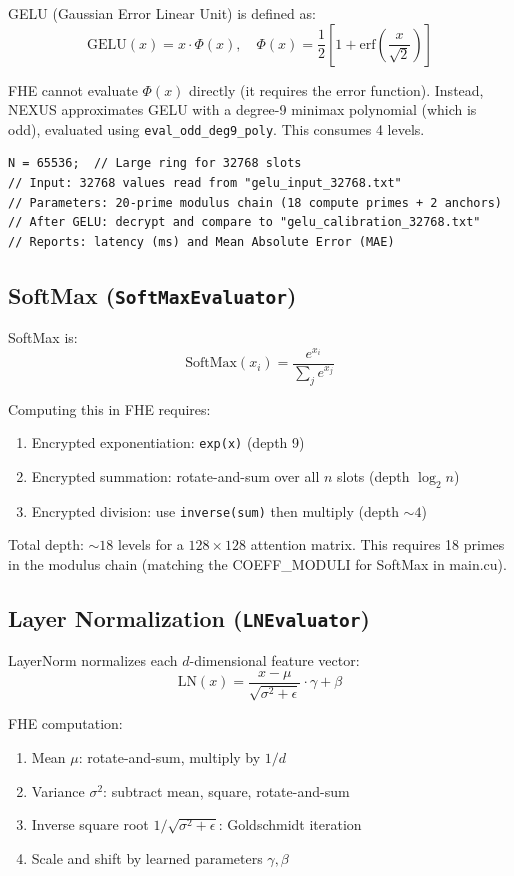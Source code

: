 \documentclass[11pt,letterpaper]{article}
\begin{document}
GELU (Gaussian Error Linear Unit) is defined as:
\[
\text{GELU}(x) = x \cdot \Phi(x), \quad \Phi(x) = \frac{1}{2}\left[1 + \text{erf}\left(\frac{x}{\sqrt{2}}\right)\right]
\]

FHE cannot evaluate $\Phi(x)$ directly (it requires the error function). Instead, NEXUS
approximates GELU with a degree-9 minimax polynomial (which is odd), evaluated using
\texttt{eval\_odd\_deg9\_poly}. This consumes 4 levels.

\begin{lstlisting}[style=cpp, caption=GELU benchmark setup (main.cu)]
N = 65536;  // Large ring for 32768 slots
// Input: 32768 values read from "gelu_input_32768.txt"
// Parameters: 20-prime modulus chain (18 compute primes + 2 anchors)
// After GELU: decrypt and compare to "gelu_calibration_32768.txt"
// Reports: latency (ms) and Mean Absolute Error (MAE)
\end{lstlisting}

\subsection{SoftMax (\texttt{SoftMaxEvaluator})}

SoftMax is:
\[
\text{SoftMax}(x_i) = \frac{e^{x_i}}{\sum_j e^{x_j}}
\]

Computing this in FHE requires:
\begin{enumerate}
  \item Encrypted exponentiation: \texttt{exp(x)} (depth 9)
  \item Encrypted summation: rotate-and-sum over all $n$ slots (depth $\log_2 n$)
  \item Encrypted division: use \texttt{inverse(sum)} then multiply (depth $\sim 4$)
\end{enumerate}

Total depth: $\sim 18$ levels for a $128 \times 128$ attention matrix. This requires 18
primes in the modulus chain (matching the COEFF\_MODULI for SoftMax in main.cu).

\subsection{Layer Normalization (\texttt{LNEvaluator})}

LayerNorm normalizes each $d$-dimensional feature vector:
\[
\text{LN}(x) = \frac{x - \mu}{\sqrt{\sigma^2 + \epsilon}} \cdot \gamma + \beta
\]

FHE computation:
\begin{enumerate}
  \item Mean $\mu$: rotate-and-sum, multiply by $1/d$
  \item Variance $\sigma^2$: subtract mean, square, rotate-and-sum
  \item Inverse square root $1/\sqrt{\sigma^2 + \epsilon}$: Goldschmidt iteration
  \item Scale and shift by learned parameters $\gamma, \beta$
\end{enumerate}
\end{document}
